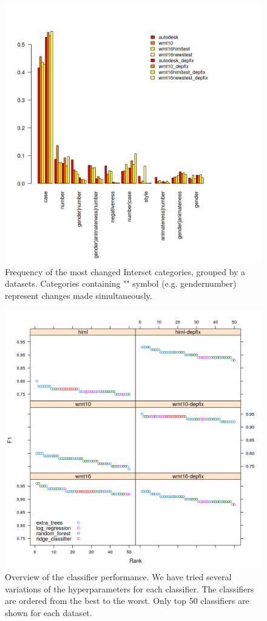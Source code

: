 \begin{figure}
\centering
  \includegraphics[scale=0.7]{iset}
  \caption{
    Frequency of the most changed Interset categories, grouped by a datasets. Categories containing
    "\textbar" symbol (e.g. gender\textbar{}number) represent changes made simultaneously.
}
  \label{iset-barplot}
\end{figure}

\begin{figure}
\centering
  \includegraphics[scale=0.7]{cat-class}
  \caption{
    Overview of the classifier performance. We have tried several variations of the hyperparameters
for each classifier. The classifiers are ordered from the best to the worst. Only top 50 classifiers
are shown for each dataset.
}
  \label{cats-draft}
\end{figure}


